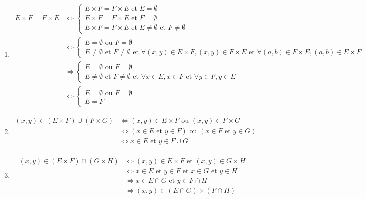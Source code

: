 \documentclass[../main.tex]{subfiles}
\begin{document}
\begin{enumerate}
    \item 
    \begin{align*}
        E \times F = F \times E &\Leftrightarrow 
        \begin{cases}
            E \times F = F \times E \text{ et } E = \emptyset \\
            E \times F = F \times E \text{ et } F = \emptyset \\
            E \times F = F \times E \text{ et } E \not = \emptyset \text{ et } F \not = \emptyset
        \end{cases}
        \\
        &\Leftrightarrow 
        \begin{cases}
            E = \emptyset \text{ ou } F = \emptyset \\
            E \not = \emptyset \text{ et } F \not = \emptyset \text{ et } \forall (x, y) \in E \times F, (x, y) \in F \times E \text{ et } \forall (a, b) \in F \times E, (a, b) \in E \times F
        \end{cases}
        \\
        &\Leftrightarrow 
        \begin{cases}
            E = \emptyset \text{ ou } F = \emptyset \\
            E \not = \emptyset \text{ et } F \not = \emptyset \text{ et } \forall x \in E, x \in F \text{ et } \forall y \in F, y \in E
        \end{cases}
        \\
        &\Leftrightarrow
        \begin{cases}
            E = \emptyset \text{ ou } F = \emptyset \\
            E = F
        \end{cases}
    \end{align*}

    \item 
    \begin{align*}
        (x, y) \in (E \times F) \cup (F \times G) &\Leftrightarrow (x, y) \in E \times F \text{ ou } (x, y) \in F \times G \\
        &\Leftrightarrow (x \in E \text{ et } y \in F) \text{ ou } (x \in F \text{ et } y \in G) \\
        &\Leftrightarrow x \in E \text{ et } y \in F \cup G \\
    \end{align*}

    \item
    \begin{align*}
        (x, y) \in (E \times F) \cap (G \times H) &\Leftrightarrow (x, y) \in E \times F \text{ et } (x, y) \in G \times H \\
        &\Leftrightarrow x \in E \text{ et } y \in F \text{ et } x \in G \text{ et } y \in H \\
        &\Leftrightarrow x \in E \cap G \text{ et } y \in F \cap H \\
        &\Leftrightarrow (x, y) \in (E \cap G) \times (F \cap H)
    \end{align*}
\end{enumerate}
\end{document}
